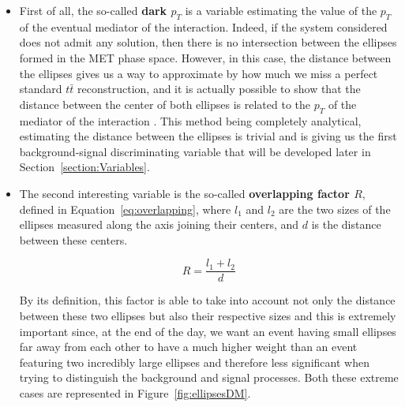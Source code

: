 \documentclass[a4paper, 10pt, openright]{report}
\begin{document}
\begin{itemize}
\item First of all, the so-called \textbf{dark $p_T$} is a variable estimating the value of the $p_T$ of the eventual mediator of the interaction. Indeed, if the system considered does not admit any solution, then there is no intersection between the ellipses formed in the \ac{MET} phase space. However, in this case, the distance between the ellipses gives us a way to approximate by how much we miss a perfect standard $t \bar t$ reconstruction, and it is actually possible to show that the distance between the center of both ellipses is related to the $p_T$ of the mediator of the interaction \cite{Agustin}. This method being completely analytical, estimating the distance between the ellipses is trivial and is giving us the first background-signal discriminating variable that will be developed later in Section~\ref{section:Variables}.
\item The second interesting variable is the so-called \textbf{overlapping factor $R$}, defined in Equation~\ref{eq:overlapping}, where $l_1$ and $l_2$ are the two sizes of the ellipses measured along the axis joining their centers, and $d$ is the distance between these centers.

\begin{equation}
\label{eq:overlapping}
R = \frac{l_1 + l_2}{d}
\end{equation}

By its definition, this factor is able to take into account not only the distance between these two ellipses but also their respective sizes and this is extremely important since, at the end of the day, we want an event having small ellipses far away from each other to have a much higher weight than an event featuring two incredibly large ellipses and therefore less significant when trying to distinguish the background and signal processes. Both these extreme cases are represented in Figure~\ref{fig:ellipsesDM}.


\end{itemize}
\end{document}
